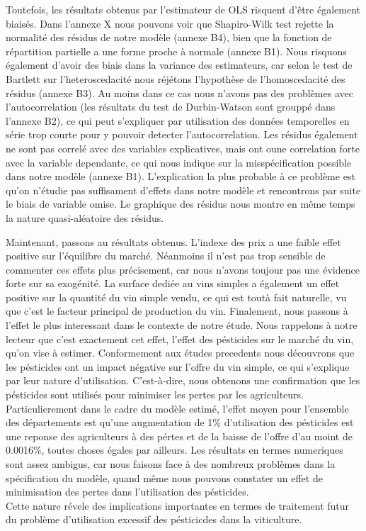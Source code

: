 \documentclass[11pt,]{article}
\begin{document}
Toutefois, les résultats obtenus par l'estimateur de OLS risquent d'être
également biaisés. Dans l'annexe X nous pouvons voir que Shapiro-Wilk
test rejette la normalité des résidus de notre modèle (annexe B4), bien
que la fonction de répartition partielle a une forme proche à normale
(annexe B1). Nous risquons également d'avoir des biais dans la variance
des estimateurs, car selon le test de Bartlett sur l'heteroscedacité
nous réjétons l'hypothèse de l'homoscedacité des résidus (annexe B3). Au
moins dans ce cas nous n'avons pas des problèmes avec l'autocorrelation
(les résultats du test de Durbin-Watson sont grouppé dans l'annexe B2),
ce qui peut s'expliquer par utilisation des données temporelles en série
trop courte pour y pouvoir detecter l'autocorrelation. Les résidus
également ne sont pas correlé avec des variables explicatives, mais ont
oune correlation forte avec la variable dependante, ce qui nous indique
sur la misspécification possible dans notre modèle (annexe B1).
L'explication la plus probable à ce problème est qu'on n'étudie pas
suffisament d'effets dans notre modèle et rencontrons par suite le biais
de variable omise. Le graphique des résidus nous montre en même temps la
nature quasi-aléatoire des résidus.

Maintenant, passons au résultats obtenus. L'indexe des prix a une faible
effet positive sur l'équilibre du marché. Néanmoins il n'est pas trop
sensible de commenter ces effets plus précisement, car nous n'avons
toujour pas une évidence forte sur sa exogénité. La surface dediée au
vins simples a également un effet positive sur la quantité du vin simple
vendu, ce qui est toutà fait naturelle, vu que c'est le facteur
principal de production du vin. Finalement, nous passons à l'effet le
plus interessant dans le contexte de notre étude. Nous rappelons à notre
lecteur que c'est exactement cet effet, l'effet des pésticides sur le
marché du vin, qu'on vise à estimer. Conformement aux études precedents
nous découvrons que les pésticides ont un impact négative sur l'offre du
vin simple, ce qui s'explique par leur nature d'utilisation.
C'est-à-dire, nous obtenons une confirmation que les pésticides sont
utilisés pour minimiser les pertes par les agriculteurs.
Particulierement dans le cadre du modèle estimé, l'effet moyen pour
l'ensemble des départements est qu'une augmentation de 1\% d'utilisation
des pésticides est une reponse des agriculteurs à des pértes et de la
baisse de l'offre d'au moint de 0.0016\%, toutes choses égales par
ailleurs. Les résultats en termes numeriques sont assez ambigus, car
nous faisons face à des nombreux problèmes dans la spécification du
modèle, quand même nous pouvons constater un effet de minimisation des
pertes dans l'utilisation des pésticides.\\
Cette nature révele des implications importantes en termes de traitement
futur du problème d'utilisation excessif des pésticicdes dans la
viticulture.
\end{document}
